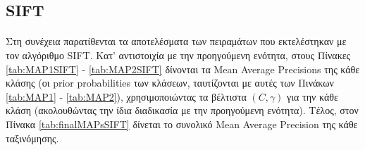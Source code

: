 \FloatBarrier

\subsection{SIFT}
\paragraph*{}
Στη συνέχεια παρατίθενται τα αποτελέσματα των πειραμάτων που εκτελέστηκαν με τον αλγόριθμο SIFT. Κατ' αντιστοιχία με την προηγούμενη ενότητα, στους Πίνακες \ref{tab:MAP1SIFT} - \ref{tab:MAP2SIFT} δίνονται τα Mean Average Precisions της κάθε κλάσης (οι prior probabilities των κλάσεων, ταυτίζονται με αυτές των Πινάκων \ref{tab:MAP1} - \ref{tab:MAP2}), χρησιμοποιώντας τα βέλτιστα $(C, \gamma)$ για την κάθε κλάση (ακολουθώντας την ίδια διαδικασία με την προηγούμενη ενότητα). Τέλος, στον Πίνακα \ref{tab:finalMAPsSIFT} δίνεται το συνολικό Mean Average Precision της κάθε ταξινόμησης. 
\\


